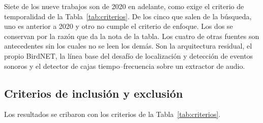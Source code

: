Siete de los nueve trabajos son de 2020 en adelante, como exige el criterio de
temporalidad de la Tabla~\ref{tab:criterios}. De los cinco que salen de la
búsqueda, uno es anterior a 2020 y otro no cumple el criterio de enfoque. Los dos
se conservan por la razón que da la nota de la tabla. Los cuatro de otras fuentes
son antecedentes sin los cuales no se leen los demás. Son la arquitectura
residual, el propio BirdNET, la línea base del desafío de localización y detección
de eventos sonoros y el detector de cajas tiempo--frecuencia sobre un extractor de
audio.

\subsection{Criterios de inclusión y exclusión}

Los resultados se cribaron con los criterios de la Tabla~\ref{tab:criterios}.

